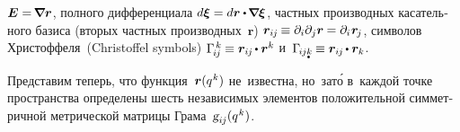 \begin{otherlanguage}{russian}
${\bm{E} = \hspace{-0.25ex} \smash{\bm{\nabla}\hspace{-0.2ex} \bm{r}}}$,
полного дифференциала ${d \bm{\xi} = d \bm{r} \dotp \hspace{-0.2ex} \boldnabla \hspace{-0.05ex} \bm{\xi}}$,
частных производных касательного \hbox{базиса} (вторых частных производных~$\bm{r}$) ${\bm{r}_{i\hspace{-0.1ex}j} \hspace{-0.16ex} \equiv \partial_i \partial_j \bm{r} \hspace{-0.1ex} = \partial_i \hspace{.12ex} \bm{r}_{\hspace{-0.2ex}j}}$,
символов  \hbox{Христоффеля}~(\hbox{Christoffel} symbols) ${\Gamma_{\hspace{-0.25ex}i\hspace{-0.1ex}j}^{\hspace{.25ex}k} \hspace{-0.1ex} \equiv \bm{r}_{i\hspace{-0.1ex}j} \hspace{-0.2ex} \dotp \bm{r}^k
}$ и~${\Gamma_{\hspace{-0.25ex}i\hspace{-0.1ex}j\mathdotbelow{k}} \hspace{-0.16ex} \equiv \bm{r}_{i\hspace{-0.1ex}j} \hspace{-0.2ex} \dotp \bm{r}_k
}$.

Представим теперь, что функция~${\bm{r}(q^{\hspace{.1ex}k})}$ не~известна, но~\hbox{зат\'{о}} в~каждой точке пространства определены шесть независимых элементов положительной симметричной метрической матрицы Грама~${\textsl{g}_{i\hspace{-0.1ex}j}(q^{\hspace{.1ex}k})}$.


\end{otherlanguage}
